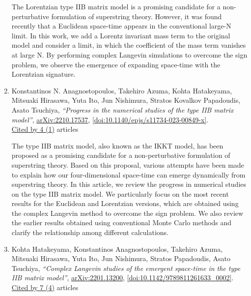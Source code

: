 \documentclass[a4paper,10pt]{article}
\begin{document}
\begin{enumerate}
The Lorentzian type IIB matrix model is a promising candidate for a non-perturbative formulation of superstring theory. However, it was found recently that a Euclidean space-time appears in the conventional large-N limit. In this work, we add a Lorentz invariant mass term to the original model and consider a limit, in which the coefficient of the mass term vanishes at large N. By performing complex Langevin simulations to overcome the sign problem, we observe the emergence of expanding space-time with the Lorentzian signature.
\item Konstantinos N. Anagnostopoulos, Takehiro Azuma, Kohta Hatakeyama, Mitsuaki Hirasawa, Yuta Ito, Jun Nishimura, Stratos Kovalkov Papadoudis, Asato Tsuchiya, {\it ``Progress in the numerical studies of the type IIB matrix model''}, \href{https://arxiv.org/abs/2210.17537}{arXiv:2210.17537}, \href{https://www.doi.org/10.1140/epjs/s11734-023-00849-x}{[doi:10.1140/epjs/s11734-023-00849-x]}.
\\\href{https://inspirehep.net/literature/?q=refersto%3Arecid%3A2173460}{Cited by 4 (1)} articles

The type IIB matrix model, also known as the IKKT model, has been proposed as a promising candidate for a non-perturbative formulation of superstring theory. Based on this proposal, various attempts have been made to explain how our four-dimensional space-time can emerge dynamically from superstring theory. In this article, we review the progress in numerical studies on the type IIB matrix model. We particularly focus on the most recent results for the Euclidean and Lorentzian versions, which are obtained using the complex Langevin method to overcome the sign problem. We also review the earlier results obtained using conventional Monte Carlo methods and clarify the relationship among different calculations.
\item Kohta Hatakeyama, Konstantinos Anagnostopoulos, Takehiro Azuma, Mitsuaki Hirasawa, Yuta Ito, Jun Nishimura, Stratos Papadoudis, Asato Tsuchiya, {\it ``Complex Langevin studies of the emergent space-time in the type IIB matrix model''}, \href{https://arxiv.org/abs/2201.13200}{arXiv:2201.13200}, \href{https://www.doi.org/10.1142/9789811261633_0002}{[doi:10.1142/9789811261633\_0002]}.
\\\href{https://inspirehep.net/literature/?q=refersto%3Arecid%3A2022364}{Cited by 7 (4)} articles


\end{enumerate}
\end{document}
